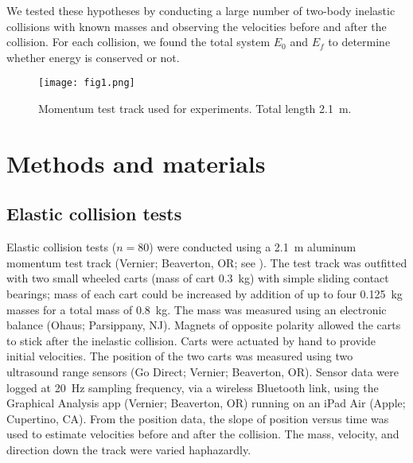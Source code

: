\documentclass[aps,prl,reprint]{revtex4-1}
\begin{document}
We tested these hypotheses by conducting a large number of two-body inelastic collisions with known masses and observing the velocities before and after the collision. For each collision, we found the total system $E_0$ and $E_f$ to determine whether energy is conserved or not. 
\begin{figure}[h]
\begin{center}
\texttt{[image: fig1.png]}
\end{center}
\caption{Momentum test track used for experiments. Total length \SI{2.1}{\meter}.}
\label{fig:methods1}
\end{figure}

\section{Methods and materials}
\subsection{Elastic collision tests}
Elastic collision tests ($n=80$) were conducted using a \SI{2.1}{\meter} aluminum momentum test track (Vernier; Beaverton, OR; see ). The test track was outfitted with two small wheeled carts (mass of cart \SI{0.3}{\kilo\gram}) with simple sliding contact bearings; mass of each cart could be increased by addition of up to four \SI{0.125}{\kilo\gram} masses for a total mass of \SI{0.8}{\kilo\gram}. The mass was measured using an electronic balance (Ohaus; Parsippany, NJ).    Magnets of opposite polarity allowed the carts to stick after the inelastic collision. Carts were actuated by hand to provide initial velocities. The position of the two carts was measured using two ultrasound range sensors (Go Direct; Vernier; Beaverton, OR). Sensor data were logged at \SI{20}{\hertz} sampling frequency, via a wireless Bluetooth link, using the Graphical Analysis app (Vernier; Beaverton, OR) running on an iPad Air (Apple; Cupertino, CA). From the position data, the slope of position versus time was used to estimate velocities before and after the collision.  The mass, velocity, and direction down the track were varied haphazardly.   
\end{document}
